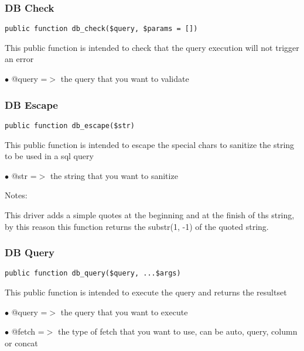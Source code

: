 \documentclass[a4paper]{article}
\begin{document}
\hypertarget{toc349}{}
\subsubsection{DB Check}

\begin{lstlisting}
public function db_check($query, $params = [])
\end{lstlisting}

This public function is intended to check that the query execution will not trigger an error

\begin{compactitem}
\item[\color{myblue}$\bullet$] @query =$>$ the query that you want to validate
\end{compactitem}

\hypertarget{toc350}{}
\subsubsection{DB Escape}

\begin{lstlisting}
public function db_escape($str)
\end{lstlisting}

This public function is intended to escape the special chars to sanitize the string to be used
in a sql query

\begin{compactitem}
\item[\color{myblue}$\bullet$] @str =$>$ the string that you want to sanitize
\end{compactitem}

Notes:

This driver adds a simple quotes at the beginning and at the finish of ths string, by this
reason this function returns the substr(1, -1) of the quoted string.

\hypertarget{toc351}{}
\subsubsection{DB Query}

\begin{lstlisting}
public function db_query($query, ...$args)
\end{lstlisting}

This public function is intended to execute the query and returns the resultset

\begin{compactitem}
\item[\color{myblue}$\bullet$] @query =$>$ the query that you want to execute
\item[\color{myblue}$\bullet$] @fetch =$>$ the type of fetch that you want to use, can be auto, query, column or concat
\end{compactitem}
\end{document}
